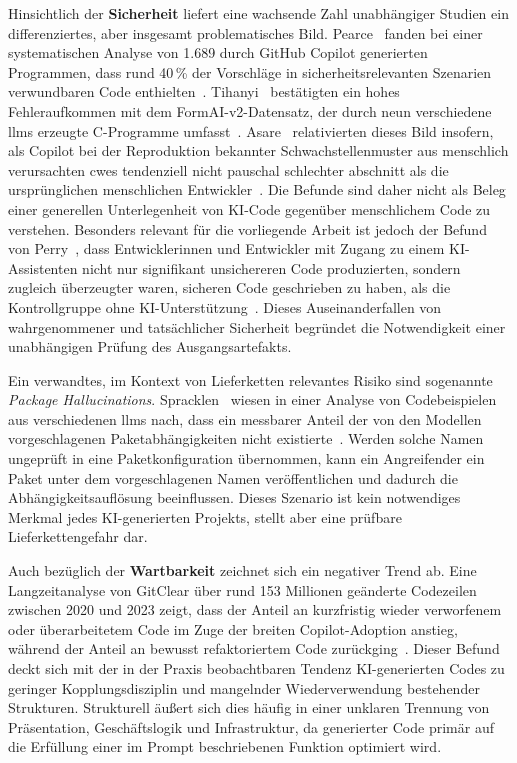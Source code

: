Hinsichtlich der \textbf{Sicherheit} liefert eine wachsende Zahl unabhängiger Studien ein differenziertes, aber insgesamt problematisches Bild.
Pearce~\etal{} fanden bei einer systematischen Analyse von 1.689 durch GitHub Copilot generierten Programmen, dass rund 40\,\% der Vorschläge in sicherheitsrelevanten Szenarien verwundbaren Code enthielten~\cite{pearce2022asleep}.
Tihanyi~\etal{} bestätigten ein hohes Fehleraufkommen mit dem FormAI-v2-Datensatz, der durch neun verschiedene \glspl{llm} erzeugte C-Programme umfasst~\cite{tihanyi2024secure}.
Asare~\etal{} relativierten dieses Bild insofern, als Copilot bei der Reproduktion bekannter Schwachstellenmuster aus menschlich verursachten \glspl{cwe} tendenziell nicht pauschal schlechter abschnitt als die ursprünglichen menschlichen Entwickler~\cite{asare2023copilot}.
Die Befunde sind daher nicht als Beleg einer generellen Unterlegenheit von KI-Code gegenüber menschlichem Code zu verstehen.
Besonders relevant für die vorliegende Arbeit ist jedoch der Befund von Perry~\etal{}, dass Entwicklerinnen und Entwickler mit Zugang zu einem KI-Assistenten nicht nur signifikant unsichereren Code produzierten, sondern zugleich überzeugter waren, sicheren Code geschrieben zu haben, als die Kontrollgruppe ohne KI-Unterstützung~\cite{perry2023users}.
Dieses Auseinanderfallen von wahrgenommener und tatsächlicher Sicherheit begründet die Notwendigkeit einer unabhängigen Prüfung des Ausgangsartefakts.

Ein verwandtes, im Kontext von Lieferketten relevantes Risiko sind sogenannte \emph{Package Hallucinations}.
Spracklen~\etal{} wiesen in einer Analyse von Codebeispielen aus verschiedenen \glspl{llm} nach, dass ein messbarer Anteil der von den Modellen vorgeschlagenen Paketabhängigkeiten nicht existierte~\cite{spracklen2025package}.
Werden solche Namen ungeprüft in eine Paketkonfiguration übernommen, kann ein Angreifender ein Paket unter dem vorgeschlagenen Namen veröffentlichen und dadurch die Abhängigkeitsauflösung beeinflussen.
Dieses Szenario ist kein notwendiges Merkmal jedes KI-generierten Projekts, stellt aber eine prüfbare Lieferkettengefahr dar.

Auch bezüglich der \textbf{Wartbarkeit} zeichnet sich ein negativer Trend ab.
Eine Langzeitanalyse von GitClear über rund 153 Millionen geänderte Codezeilen zwischen 2020 und 2023 zeigt, dass der Anteil an kurzfristig wieder verworfenem oder überarbeitetem Code im Zuge der breiten Copilot-Adoption anstieg, während der Anteil an bewusst refaktoriertem Code zurückging~\cite{gitclear2024coding}.
Dieser Befund deckt sich mit der in der Praxis beobachtbaren Tendenz KI-generierten Codes zu geringer Kopplungsdisziplin und mangelnder Wiederverwendung bestehender Strukturen.
Strukturell äußert sich dies häufig in einer unklaren Trennung von Präsentation, Geschäftslogik und Infrastruktur, da generierter Code primär auf die Erfüllung einer im Prompt beschriebenen Funktion optimiert wird.

